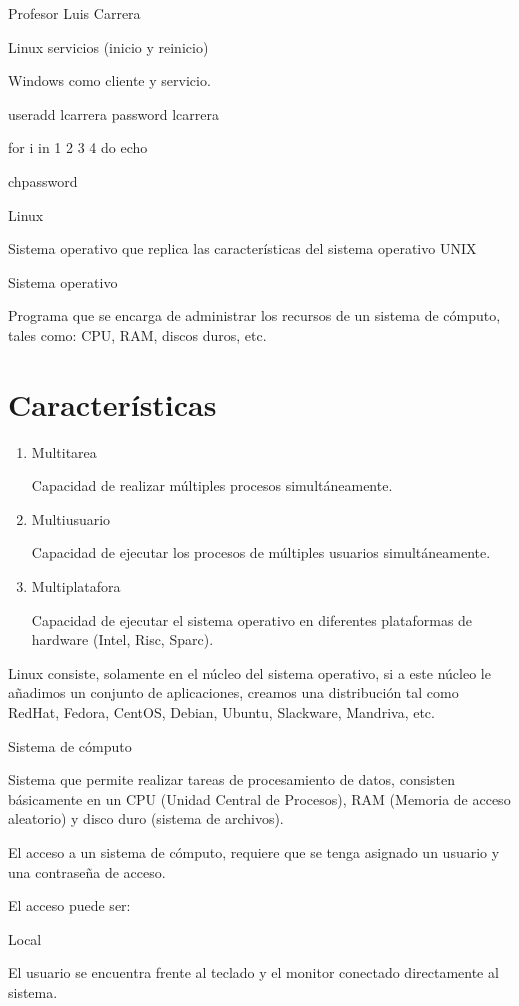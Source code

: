 \documentclass{memoir}
\begin{document}
Profesor Luis Carrera

Linux servicios (inicio y reinicio)
 
 Windows como cliente y servicio.

 useradd lcarrera
 password lcarrera


 for i in 1 2 3 4 
 do
 echo 

chpassword

Linux

Sistema operativo que replica las características del sistema operativo UNIX

Sistema operativo

Programa que se encarga de administrar los recursos de un sistema de cómputo, tales como: CPU, RAM, discos duros, etc.
\section{Características}

\begin{enumerate}
\item Multitarea

Capacidad de realizar múltiples procesos simultáneamente.

\item Multiusuario

Capacidad de ejecutar los procesos de múltiples usuarios simultáneamente.

\item Multiplatafora	

Capacidad de ejecutar el sistema operativo en diferentes plataformas de hardware (Intel, Risc, Sparc).
\end{enumerate}

Linux consiste, solamente en el núcleo del sistema operativo, si a este núcleo le añadimos un conjunto de aplicaciones, creamos una distribución tal como RedHat, Fedora, CentOS, Debian, Ubuntu, Slackware, Mandriva, etc.

Sistema de cómputo

Sistema que permite realizar tareas de procesamiento de datos, consisten básicamente en un CPU (Unidad Central de Procesos), RAM (Memoria de acceso aleatorio) y disco duro (sistema de archivos).

El acceso a un sistema de cómputo, requiere que se tenga asignado un usuario y una contraseña de acceso.

El acceso puede ser:

Local

El usuario se encuentra frente al teclado y el monitor conectado directamente al sistema.
\end{document}
